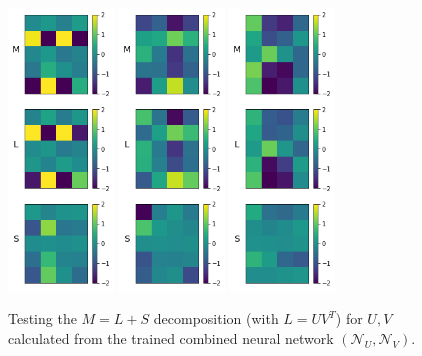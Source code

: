 \begin{figure}
	\centering
	\includegraphics[width=0.25\textwidth]{fig/SVD_testMLS1_[5,4]_k2.png}
	\includegraphics[width=0.25\textwidth]{fig/SVD_testMLS2_[5,4]_k2.png}
	\includegraphics[width=0.25\textwidth]{fig/SVD_testMLS3_[5,4]_k2.png}
	\caption{Testing the $M = L + S$ decomposition (with $L=UV^T$) for $U,V$ calculated from the trained combined neural network $(\mathcal{N}_U,\mathcal{N}_V)$.}
	\label{fig:SVD_testMLS}
\end{figure}



